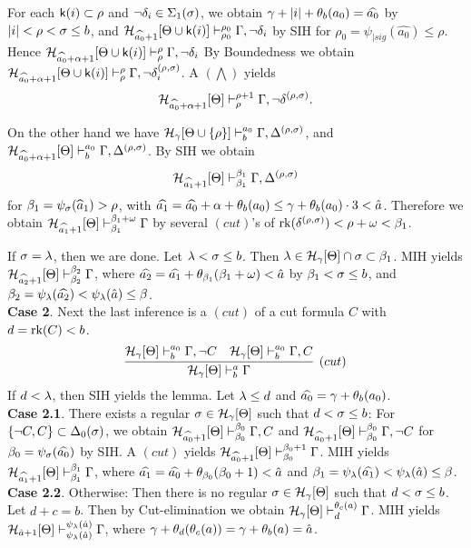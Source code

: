 \documentclass{article}
\begin{document}
For each ${\sf k}(i)\subset\rho$ and $\lnot\delta_{i}\in \Sigma_{1}(\sigma)$, we obtain
$\gamma+|i|+\theta_{b}(a_{0})=\widehat{a_{0}}$ by $|i|<\rho<\sigma\leq b$, and
$\mathcal{H}_{\widehat{a_{0}}+1}[\Theta\cup{\sf k}(i)]\vdash^{\rho_{0}}_{\rho_{0}}\Gamma, \lnot\delta_{i}$ by SIH
for $\rho_{0}=\psi_{|sig}(\widehat{a_{0}})\leq\rho$.
Hence
$\mathcal{H}_{\widehat{a_{0}}+\alpha+1}[\Theta\cup{\sf k}(i)]\vdash^{\rho}_{\rho}\Gamma, \lnot\delta_{i}$
By Boundedness we obtain
$\mathcal{H}_{\widehat{a_{0}}+\alpha+1}[\Theta\cup{\sf k}(i)]\vdash^{\rho}_{\rho}\Gamma, \lnot\delta_{i}^{(\rho,\sigma)}$.
A $(\bigwedge)$ yields
\[
\mathcal{H}_{\widehat{a_{0}}+\alpha+1}[\Theta]\vdash^{\rho+1}_{\rho}\Gamma, \lnot\delta^{(\rho,\sigma)}
.\]

On the other hand we have
$\mathcal{H}_{\gamma}[\Theta\cup\{\rho\}]\vdash^{a_{0}}_{b}\Gamma, 
\Delta^{(\rho,\sigma)}$, and 
$\mathcal{H}_{\widehat{a_{0}}+\alpha+1}[\Theta]\vdash^{a_{0}}_{b}\Gamma, 
\Delta^{(\rho,\sigma)}$.
By SIH we obtain
\[
\mathcal{H}_{\widehat{a_{1}}+1}[\Theta]\vdash^{\beta_{1}}_{\beta_{1}}\Gamma, 
\Delta^{(\rho,\sigma)}
\]
 for 
$\beta_{1}=\psi_{\sigma}(\widehat{a}_{1})>\rho$, with
$\widehat{a_{1}}=\widehat{a_{0}}+\alpha+\theta_{b}(a_{0})\leq\gamma+\theta_{b}(a_{0})\cdot 3<\hat{a}$.
Therefore we obtain
$\mathcal{H}_{\widehat{a_{1}}+1}[\Theta]\vdash^{\beta_{1}+\omega}_{\beta_{1}}\Gamma$
by several $(cut)$'s of $\mbox{{\rm rk}}(\delta^{(\rho,\sigma)})<\rho+\omega<\beta_{1}$.

If $\sigma=\lambda$, then we are done.
Let $\lambda<\sigma\leq b$. Then $\lambda\in{\cal H}_{\gamma}[\Theta]\cap\sigma\subset\beta_{1}$.
MIH yields
$\mathcal{H}_{\widehat{a_{2}}+1}[\Theta]\vdash^{\beta_{2}}_{\beta_{2}}\Gamma$,
where
$\widehat{a_{2}}=\widehat{a_{1}}+\theta_{\beta_{1}}(\beta_{1}+\omega)<\hat{a}$
by $\beta_{1}<\sigma\leq b$,
and
$\beta_{2}=\psi_{\lambda}(\widehat{a_{2}})<\psi_{\lambda}(\hat{a})\leq\beta$.
\\
\textbf{Case 2}.
Next the last inference is a $(cut)$ of a cut formula $C$ with $d=\mbox{{\rm rk}}(C)<b$.
\[
\infer[(cut)]{\calh_{\gam}[\Tht]\vdash^{a}_{b}\Gam}
{
\calh_{\gam}[\Tht]\vdash^{a_{0}}_{b}\Gam,\lnot C
&
\calh_{\gam}[\Tht]\vdash^{a_{0}}_{b}\Gam, C
}
\]
If $d<\lambda$, then SIH yields the lemma. Let $\lambda\leq d$ and
$\widehat{a_{0}}=\gamma+\theta_{b}(a_{0})$.
\\
\textbf{Case 2.1}.
There exists a regular $\sigma\in{\cal H}_{\gamma}[\Theta]$ such that
$d<\sigma\leq b$:
For $\{\lnot C,C\}\subset\Delta_{0}(\sigma)$, we obtain
${\cal H}_{\widehat{a_{0}}+1}[\Theta]\vdash^{\beta_{0}}_{\beta_{0}}\Gamma,C$
and
${\cal H}_{\widehat{a_{0}}+1}[\Theta]\vdash^{\beta_{0}}_{\beta_{0}}\Gamma,\lnot C$ for $\beta_{0}=\psi_{\sigma}(\widehat{a_{0}})$ by SIH.
A $(cut)$ yields
${\cal H}_{\widehat{a_{0}}+1}[\Theta]\vdash^{\beta_{0}+1}_{\beta_{0}}\Gamma$.
MIH yields
${\cal H}_{\widehat{a_{1}}+1}[\Theta]\vdash^{\beta_{1}}_{\beta_{1}}\Gamma$,
where $\widehat{a_{1}}=\widehat{a_{0}}+\theta_{\beta_{0}}(\beta_{0}+1)<\hat{a}$
and $\beta_{1}=\psi_{\lambda}(\widehat{a_{1}})<\psi_{\lambda}(\hat{a})\leq\beta$.
\\
\textbf{Case 2.2}. Otherwise:
Then there is no regular $\sigma\in{\cal H}_{\gamma}[\Theta]$ such that $d<\sigma\leq b$.
Let $d+c=b$.
Then by Cut-elimination we obtain
${\cal H}_{\gamma}[\Theta]\vdash^{\theta_{c}(a)}_{d}\Gamma$.
MIH yields
${\cal H}_{\hat{a}+1}[\Theta]\vdash^{\psi_{\lambda}(\hat{a})}_{\psi_{\lambda}(\hat{a})}\Gamma$, where
$\gamma+\theta_{d}(\theta_{c}(a))=\gamma+\theta_{b}(a)=\hat{a}$.
\eprf
\end{document}
